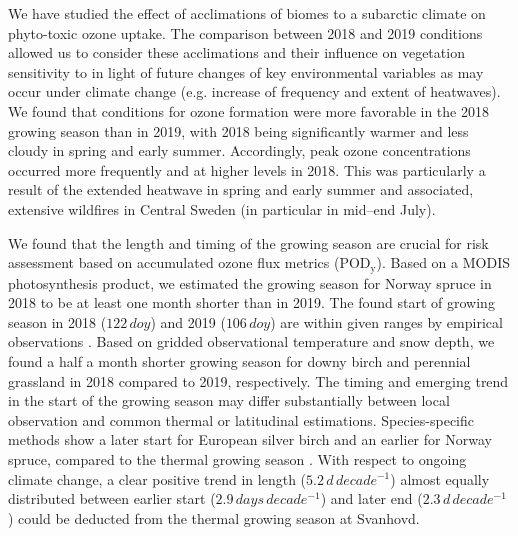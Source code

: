 \documentclass[bg, manuscript]{copernicus}
\begin{document}
\label{sec:conc}

We have studied the effect of acclimations of biomes to a subarctic climate on phyto-toxic ozone uptake. The comparison between 2018 and 2019 conditions allowed us to consider these acclimations and their influence on vegetation sensitivity to  in light of future changes of key environmental variables as may occur under climate change (e.g. increase of frequency and extent of heatwaves). We found that conditions for ozone formation were more favorable in the 2018 growing season than in 2019, with 2018 being significantly warmer and less cloudy in spring and early summer. Accordingly, peak ozone concentrations occurred more frequently and at higher levels in 2018. This was particularly a result of the extended heatwave in spring and early summer and associated, extensive wildfires in Central Sweden (in particular in mid--end July).

We found that the length and timing of the growing season are crucial for risk assessment based on accumulated ozone flux metrics ($\mathrm{POD_y}$). Based on a MODIS photosynthesis product, we estimated the growing season for Norway spruce in 2018 to be at least one month shorter than in 2019. The found start of growing season in 2018 ($122\,\unit{doy}$) and 2019 ($106\,\unit{doy}$) are within given ranges by empirical observations \citep{TB:Kolari2007,IVL:Karlsson2018}. Based on gridded observational temperature and snow depth, we found a half a month shorter growing season for downy birch and perennial grassland in 2018 compared to 2019, respectively. The timing and emerging trend in the start of the growing season may differ substantially between local observation and common thermal or latitudinal estimations. Species-specific methods show a later start for European silver birch and an earlier for Norway spruce, compared to the thermal growing season \citep{IVL:Karlsson2018}. With respect to ongoing climate change, a clear positive trend in length ($5.2\,\unit{d\,decade^{-1}}$) almost equally distributed between earlier start ($2.9\,\unit{days\,decade^{-1}}$) and later end ($2.3\,\unit{d\,decade^{-1}}$) could be deducted from the thermal growing season at Svanhovd.
\end{document}
